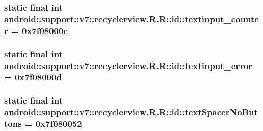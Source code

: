 \hypertarget{classandroid_1_1support_1_1v7_1_1recyclerview_1_1_r_1_1id_1a2eac02faeab21ab071df7b48998a9d}{
\subsubsection[{textinput\_\-counter}]{\setlength{\rightskip}{0pt plus 5cm}static final int android::support::v7::recyclerview.R.R::id::textinput\_\-counter = 0x7f08000c}}
\label{classandroid_1_1support_1_1v7_1_1recyclerview_1_1_r_1_1id_1a2eac02faeab21ab071df7b48998a9d}


\hypertarget{classandroid_1_1support_1_1v7_1_1recyclerview_1_1_r_1_1id_6188ca68279316b5739c2d06d90aca9a}{
\subsubsection[{textinput\_\-error}]{\setlength{\rightskip}{0pt plus 5cm}static final int android::support::v7::recyclerview.R.R::id::textinput\_\-error = 0x7f08000d}}
\label{classandroid_1_1support_1_1v7_1_1recyclerview_1_1_r_1_1id_6188ca68279316b5739c2d06d90aca9a}


\hypertarget{classandroid_1_1support_1_1v7_1_1recyclerview_1_1_r_1_1id_34ffe92d78eebe9c04f4cbd4e9e6b017}{
\subsubsection[{textSpacerNoButtons}]{\setlength{\rightskip}{0pt plus 5cm}static final int android::support::v7::recyclerview.R.R::id::textSpacerNoButtons = 0x7f080052}}
\label{classandroid_1_1support_1_1v7_1_1recyclerview_1_1_r_1_1id_34ffe92d78eebe9c04f4cbd4e9e6b017}


